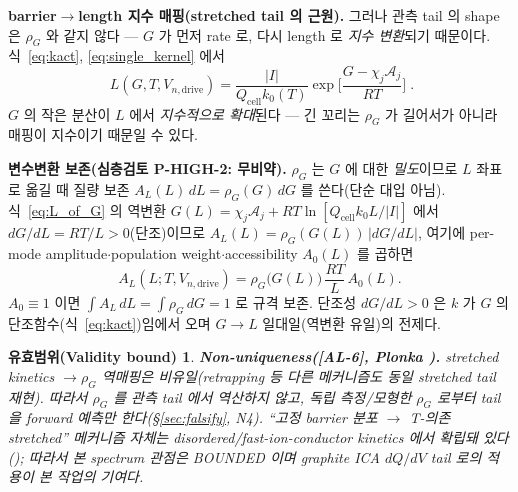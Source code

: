 \documentclass[11pt,a4paper]{article}
\newtheorem*{boundbox}{유효범위(Validity bound)}
\newcommand{\drive}{\mathrm{drive}}
\newcommand{\cell}{\mathrm{cell}}
\newcommand{\AL}[1]{\textsf{[AL-#1]}}
\begin{document}
\textbf{barrier$\to$length 지수 매핑(stretched tail 의 근원).} 그러나 관측 tail 의 shape 은 $\rho_G$ 와
같지 않다 — $G$ 가 먼저 rate 로, 다시 length 로 \emph{지수 변환}되기 때문이다. 식~\eqref{eq:kact},
\eqref{eq:single_kernel} 에서
\begin{equation}
\boxed{\;L(G,T,V_{n,\drive})=\frac{|I|}{Q_\cell k_0(T)}\exp\!\Big[\frac{G-\chi_j\mathcal A_j}{RT}\Big]\;.}
\label{eq:L_of_G}
\end{equation}
$G$ 의 작은 분산이 $L$ 에서 \emph{지수적으로 확대}된다 — 긴 꼬리는 $\rho_G$ 가 길어서가 아니라 매핑이
지수이기 때문일 수 있다.

\textbf{변수변환 보존(심층검토 P-HIGH-2: 무비약).} $\rho_G$ 는 $G$ 에 대한 \emph{밀도}이므로 $L$ 좌표로
옮길 때 질량 보존 $A_L(L)\,dL=\rho_G(G)\,dG$ 를 쓴다(단순 대입 아님). 식~\eqref{eq:L_of_G} 의 역변환
$G(L)=\chi_j\mathcal A_j+RT\ln[Q_\cell k_0 L/|I|]$ 에서 $dG/dL=RT/L>0$(단조)이므로
$A_L(L)=\rho_G(G(L))\,|dG/dL|$, 여기에 per-mode amplitude$\cdot$population weight$\cdot$accessibility
$A_0(L)$ 를 곱하면
\begin{equation}
A_L(L;T,V_{n,\drive})=\rho_G\big(G(L)\big)\,\frac{RT}{L}\,A_0(L).
\label{eq:spectrum}
\end{equation}
$A_0\equiv1$ 이면 $\int A_L\,dL=\int\rho_G\,dG=1$ 로 규격 보존. 단조성 $dG/dL>0$ 은 $k$ 가 $G$ 의
단조함수(식~\eqref{eq:kact})임에서 오며 $G\!\to\!L$ 일대일(역변환 유일)의 전제다.
\begin{boundbox}
\textbf{Non-uniqueness(\AL{6}, Plonka \cite{plonka2001}).} stretched kinetics $\to\rho_G$ 역매핑은
\emph{비유일}(retrapping 등 다른 메커니즘도 동일 stretched tail 재현). 따라서 $\rho_G$ 를 관측 tail 에서
\emph{역산하지 않고}, 독립 측정/모형한 $\rho_G$ 로부터 tail 을 \emph{forward 예측}만 한다(\S\ref{sec:falsify}, N4).
``고정 barrier 분포 $\to$ T-의존 stretched'' 메커니즘 자체는 disordered/fast-ion-conductor kinetics 에서
확립돼 있다(\cite{macdonald2000,lindsey1980}); 따라서 본 spectrum 관점은 BOUNDED 이며 \emph{graphite ICA
$dQ/dV$ tail 로의 적용}이 본 작업의 기여다.
\end{boundbox}

\end{document}
